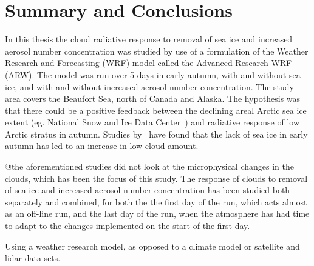 \chapter{Summary and Conclusions}
\label{chap:summaryconclusions}
In this thesis the cloud radiative response to removal of sea ice and increased aerosol number concentration was studied by use of a formulation of the Weather Research and Forecasting (WRF) model called the Advanced Research WRF (ARW). The model was run over 5 days in early autumn, with and without sea ice, and with and without increased aerosol number concentration. The study area covers the Beaufort Sea, north of Canada and Alaska. The hypothesis was that there could be a positive feedback between the declining areal Arctic sea ice extent (eg. National Snow and Ice Data Center~\citep{NSIDC}) and radiative response of low Arctic stratus in autumn. Studies by~\citet{Eastman2010a,Kay2009,Palm2010} have found that the lack of sea ice in early autumn has led to an increase in low cloud amount.%

@the aforementioned studies did not look at the microphysical changes in the clouds, which has been the focus of this study. The response of clouds to removal of sea ice and increased aerosol number concentration has been studied both separately and combined, for both the the first day of the run, which acts almost as an off-line run, and the last day of the run, when the atmosphere has had time to adapt to the changes implemented on the start of the first day.

Using a weather research model, as opposed to a climate model or satellite and lidar data sets.

